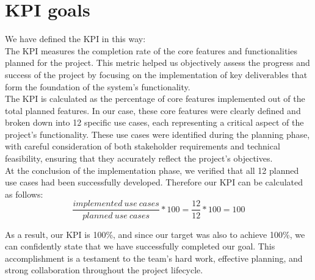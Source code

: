 \documentclass{article}
\begin{document}
\section{KPI goals}
We have defined the KPI in this way: \\
The KPI measures the completion rate of the core features and functionalities planned for the project.
This metric helped us objectively assess the progress and success of the project by focusing on the implementation of key deliverables that form the foundation of the system's functionality. \\
The KPI is calculated as the percentage of core features implemented out of the total planned features. In our case, these core features were clearly defined and broken down into 12 specific use cases, each representing a critical aspect of the project's functionality. These use cases were identified during the planning phase, with careful consideration of both stakeholder requirements and technical feasibility, ensuring that they accurately reflect the project's objectives. \\
At the conclusion of the implementation phase, we verified that all 12 planned use cases had been successfully developed. Therefore our KPI can be calculated as follows:
\[ \frac{implemented\ use\ cases}{planned\ use\ cases} * 100 = \frac{12}{12}*100 = 100 \]

As a result, our KPI is 100\%, and since our target was also to achieve 100\%, we can confidently state that we have successfully completed our goal. This accomplishment is a testament to the team's hard work, effective planning, and strong collaboration throughout the project lifecycle.
\end{document}
